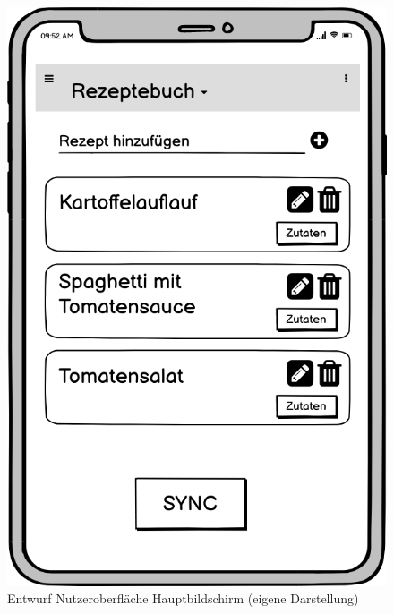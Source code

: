\documentclass[a4paper, 12pt]{scrreprt}
\begin{document}
\begin{figure}[H]
	\centering
	\begin{minipage}{.45\textwidth}
		\centering
		\includegraphics[width=1\textwidth]{wireframeRezepte2.png}
		\caption[Entwurf Nutzeroberfläche Hauptbildschirm]{Entwurf Nutzeroberfläche Hauptbildschirm (eigene Darstellung)}
		\label{fig:rezepteFrame}
	\end{minipage}
	\hspace*{\fill}
	\begin{minipage}{.45\textwidth}
		\centering

\end{minipage}
\end{figure}
\end{document}
